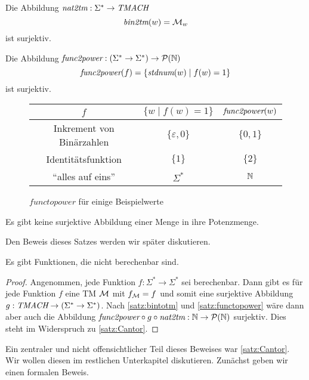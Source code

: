 \begin{lemma}\label{satz:bintotm}
 Die Abbildung $\textit{nat2tm}: \Sigma^*\rightarrow \textit{TMACH}$ 
 $$ \textit{bin2tm}(w)=\mathcal{M}_w$$
ist surjektiv.
\end{lemma}

\begin{lemma}\label{satz:functopower}
Die Abbildung $\textit{func2power}:(\Sigma^*\rightarrow\Sigma^*)\rightarrow \mathcal{P}(\mathbb{N})$
$$\textit{func2power}(f)=\{\textit{stdnum}(w)\mid f(w)=1\}$$
ist surjektiv.
\end{lemma}

 \begin{figure}[H]\centering
    \begin{tabular}{ccc}
    $f$ & $\{w\mid f(w)=1\}$ & $\textit{func2power}(w)$\\ \hline
    Inkrement von Binärzahlen & $\{\varepsilon, 0\}$ & $\{0,1\}$\\
    Identitätsfunktion & $\{1\}$ & $\{2\}$\\
    "`alles auf eins"' & $\Sigma^*$ & $\mathbb{N}$
    \end{tabular}

	\caption{$functopower$ für einige Beispielwerte}
\end{figure}


\begin{Satz}[Cantor]\label{satz:Cantor}
Es gibt keine surjektive Abbildung einer Menge in ihre Potenzmenge.
\end{Satz}
Den Beweis dieses Satzes werden wir später diskutieren.

\begin{Satz}
 Es gibt Funktionen, die nicht berechenbar sind.
\end{Satz}
\begin{proof}
 Angenommen, jede Funktion $f:\Sigma^*\rightarrow\Sigma^*$ sei berechenbar.
 Dann gibt es für jede Funktion $f$ eine \ac{TM} $\mathcal{M}$ mit $f_{\mathcal{M}}=f$ und somit eine surjektive Abbildung $g:\textit{TMACH}\rightarrow(\Sigma^*\rightarrow\Sigma^*)$.
 Nach \autoref{satz:bintotm} und \autoref{satz:functopower} wäre dann aber auch die Abbildung $\textit{func2power}\circ g \circ\textit{nat2tm}:\mathbb{N}\rightarrow\mathcal{P}(\mathbb{N})$ surjektiv.
 Dies steht im Widerspruch zu \autoref{satz:Cantor}.
\end{proof}

Ein zentraler und nicht offensichtlicher Teil dieses Beweises war \autoref{satz:Cantor}.
Wir wollen diesen im restlichen Unterkapitel diskutieren.
Zunächst geben wir einen formalen Beweis.

